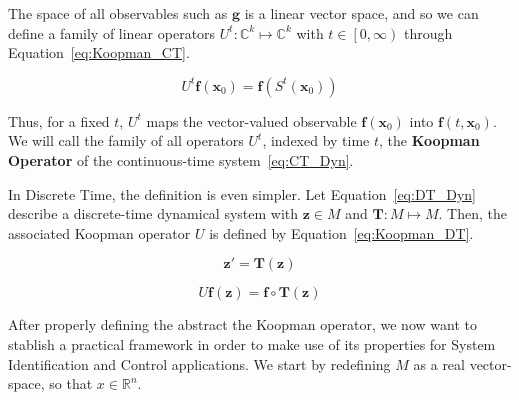 \documentclass{article}
\begin{document}
    The space of all observables such as $\mathbf{g}$ is a linear vector space, and so we can define a family of linear operators $U^t:\mathbb{C}^k \mapsto \mathbb{C}^k$ with $t \in \left[0,\infty\right)$ through Equation~\ref{eq:Koopman_CT}.

    \begin{equation} \label{eq:Koopman_CT}
        U^t \mathbf{f}\left(\mathbf{x}_0\right) = \mathbf{f} \left(S^t \left(\mathbf{x}_0\right)\right)
    \end{equation}

    Thus, for a fixed $t$, $U^t$ maps the vector-valued observable $\mathbf{f}(\mathbf{x}_0)$ into $\mathbf{f}\left(t,\mathbf{x}_0\right)$. We will call the family of all operators $U^t$, indexed by time $t$, the \textbf{Koopman Operator} of the continuous-time system~\ref{eq:CT_Dyn}.

    In Discrete Time, the definition is even simpler. Let Equation~\ref{eq:DT_Dyn} describe a discrete-time dynamical system with $\mathbf{z} \in M$ and $\mathbf{T}:M \mapsto M$. Then, the associated Koopman operator $U$ is defined by Equation~\ref{eq:Koopman_DT}.

    \begin{equation} \label{eq:DT_Dyn}
        \textbf{z}' = \textbf{T}\left(\textbf{z}\right)
    \end{equation}

    \begin{equation} \label{eq:Koopman_DT}
        U\mathbf{f}\left(\mathbf{z}\right) = \mathbf{f} \circ \mathbf{T} \left(\mathbf{z}\right)
    \end{equation}

\begin{comment}
    At this point, it is worth noting that the discrete-time Koopman operator is also linear; i.e., $U\left(c_1 \mathbf{f}_1\left(\mathbf{z}\right) + c_2 \mathbf{f}_2\left(\mathbf{z}\right)\right) =
    c_1 \mathbf{f}_1\left(\mathbf{T}\left(\mathbf{z}\right)\right) + c_2 \mathbf{f}_2\left(\mathbf{T}\left(\mathbf{z}\right)\right) =
    c_1 U\mathbf{f}_1\left(\mathbf{z}\right) + c_2 U\mathbf{f}_2\left(\mathbf{z}\right)$.
    
    Taking advantage of this linearity, we denote as $\phi : M \mapsto \mathbb{C}$ an eigenfunction of the Koopman operator $U$, associated to an eigenvalue $\lambda \in \mathbb{C}$.
\end{comment}

    After properly defining the abstract the Koopman operator, we now want to stablish a practical framework in order to make use of its properties for System Identification and Control applications. We start by redefining $M$ as a real vector-space, so that $x \in \mathbb{R}^n$.
    
\end{document}
